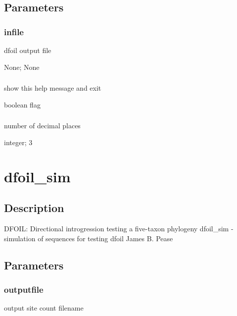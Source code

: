\documentclass[letterpaper,12pt,english]{sphinxmanual}
\begin{document}
\subsection{Parameters}
\label{\detokenize{prog_desc:id2}}

\subsubsection{infile}
\label{\detokenize{prog_desc:infile}}
 dfoil output file

 None;  None


\subsubsection{}
\label{\detokenize{prog_desc:id3}}
 show this help message and exit

 boolean flag


\subsubsection{}
\label{\detokenize{prog_desc:ndigits}}
 number of decimal places

 integer;  3


\section{dfoil\_sim}
\label{\detokenize{prog_desc:dfoil-sim}}

\subsection{Description}
\label{\detokenize{prog_desc:id4}}
DFOIL: Directional introgression testing a five-taxon phylogeny
dfoil\_sim - simulation of sequences for testing dfoil
James B. Pease


\subsection{Parameters}
\label{\detokenize{prog_desc:id5}}

\subsubsection{outputfile}
\label{\detokenize{prog_desc:outputfile}}
  output site count filename
\end{document}
